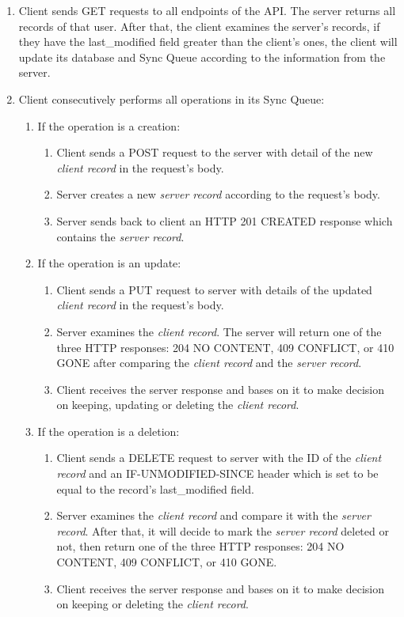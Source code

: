 \begin{enumerate}
   \item Client sends GET requests to all endpoints of the API. The server returns all records of that user. After that, the client examines the server's records, if they have the last\_modified field greater than the client's ones, the client will update its database and Sync Queue according to the information from the server.

   \item Client consecutively performs all operations in its Sync Queue:
     \begin{enumerate}
       \item If the operation is a creation:
         \begin{enumerate}
           \item Client sends a POST request to the server with detail of the new \textit{client record} in the request's body.
           \item Server creates a new \textit{server record} according to the request's body. 
           \item Server sends back to client an HTTP 201 CREATED response which contains the \textit{server record}.
         \end{enumerate}
         
       \item If the operation is an update:
         \begin{enumerate}
           \item Client sends a PUT request to server with details of the updated \textit{client record} in the request's body.
           \item Server examines the \textit{client record}. The server will return one of the three HTTP responses: 204 NO CONTENT, 409 CONFLICT, or 410 GONE after comparing the \textit{client record} and the \textit{server record}. 
           \item Client receives the server response and bases on it to make decision on keeping, updating or deleting the \textit{client record}.
         \end{enumerate}
               
       \item If the operation is a deletion:
         \begin{enumerate}
           \item Client sends a DELETE request to server with the ID of the \textit{client record} and an IF-UNMODIFIED-SINCE header which is set to be equal to the record's last\_modified field.
           \item Server examines the \textit{client record} and compare it with the \textit{server record}. After that, it will decide to mark the \textit{server record} deleted or not, then return one of the three HTTP responses: 204 NO CONTENT, 409 CONFLICT, or 410 GONE.
           \item Client receives the server response and bases on it to make decision on keeping or deleting the \textit{client record}. 
         \end{enumerate}         
     \end{enumerate}
\end{enumerate}

